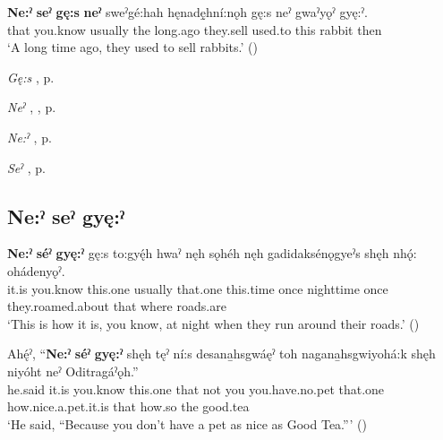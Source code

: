 \ea
\label{ex:npar89}
\gll \textbf{Ne:ˀ} \textbf{seˀ} \textbf{gę:s} \textbf{neˀ} sweˀgé:hah hęnadę̱hní:nǫh gę:s neˀ gwaˀyǫˀ gyę:ˀ. \\
that you.know usually the long.ago they.sell used.to this rabbit then\\
\glt ‘A long time ago, they used to sell rabbits.’ (\cite{mithun_how_1980})
\z

\begin{CayugaRelated}
\item \textit{Gę:s} , p. \pageref{p:[gę:s]}\\
\item \textit{Neˀ} , , p. \pageref{p:[neˀ]}\\
\item \textit{Ne:ˀ} , p. \pageref{p:[ne:ˀ] `it is’}\\
\item \textit{Seˀ} , p. \pageref{p:[seˀ]}
\end{CayugaRelated}

\subsection*{\textbf{Ne:ˀ seˀ gyę:ˀ} } \label{p:[ne:ˀ seˀ gyę:ˀ]}

\ea
\label{ex:npar90}
\gll \textbf{Ne:ˀ} \textbf{séˀ} \textbf{gyę:ˀ} gę:s to:gyę́h hwaˀ nęh sǫhéh nęh gadidaksénǫgyeˀs shęh nhǫ́: ohádenyǫˀ. \\
it.is you.know this.one usually that.one this.time once nighttime once they.roamed.about that where roads.are\\
\glt ‘This is how it is, you know, at night when they run around their roads.’ (\cite{mithun_how_1980})
\z

\ea
\label{ex:npar91}
\gll Ahę́ˀ, “\textbf{Ne:ˀ} \textbf{séˀ} \textbf{gyę:ˀ} shęh tęˀ ní:s desana̱hsgwáęˀ toh nagana̱hsgwiyohá:k shęh niyóht neˀ Oditragáˀǫh.” \\
he.said it.is you.know this.one that not you you.have.no.pet that.one how.nice.a.pet.it.is that how.so the good.tea\\
\glt ‘He said, “Because you don’t have a pet as nice as Good Tea.”’ (\cite{keye_hnyagwaidatgigowah_2012})
\z

